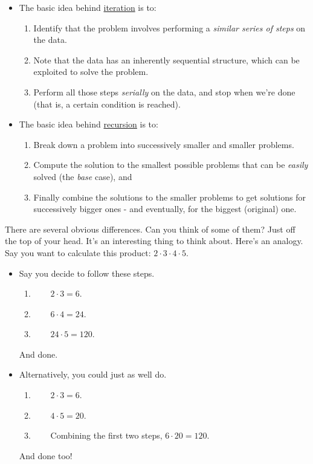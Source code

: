 \documentclass{article}
\begin{document}
\begin{itemize}
\item The basic idea behind \underline{iteration} is to:
    \begin{enumerate}
    \item Identify that the problem involves performing a \textit{similar series of steps} on the data. 
    \item Note that the data has an inherently sequential structure, which can be exploited to solve the problem. 
    \item Perform all those steps \textit{serially} on the data, and stop when we're done (that is, a certain condition is reached). 
    \end{enumerate}
\item The basic idea behind \underline{recursion} is to:
    \begin{enumerate}
    \item Break down a problem into successively smaller and smaller problems.
    \item Compute the solution to the smallest possible problems that can be \textit{easily} solved (the \textit{base} case), and 
    \item Finally combine the solutions to the smaller problems to get solutions for successively bigger ones - and eventually, for the biggest (original) one. 
    \end{enumerate}  
\end{itemize}

\noindent There are several obvious differences. Can you think of some of them? Just off the top of your head. It's an interesting thing to think about. Here's an analogy. Say you want to calculate this product: $2\cdot 3\cdot 4\cdot 5$. 

\begin{itemize}
\item Say you decide to follow these steps.
    \begin{enumerate} 
    \item \ \ \ \ $2\cdot 3 = 6$. 
    \item \ \ \ \ $6\cdot 4 = 24$.
    \item \ \ \ \ $24\cdot 5 = 120$.
    \end {enumerate}
    And done.
\item Alternatively, you could just as well do. 
    \begin{enumerate}
    \item \ \ \ \ $2\cdot 3 = 6$.
    \item \ \ \ \ $4\cdot 5 = 20$.
    \item \ \ \ \ Combining the first two steps, $6\cdot 20 = 120$.
    \end{enumerate}
    And done too!
\end{itemize}
\end{document}
